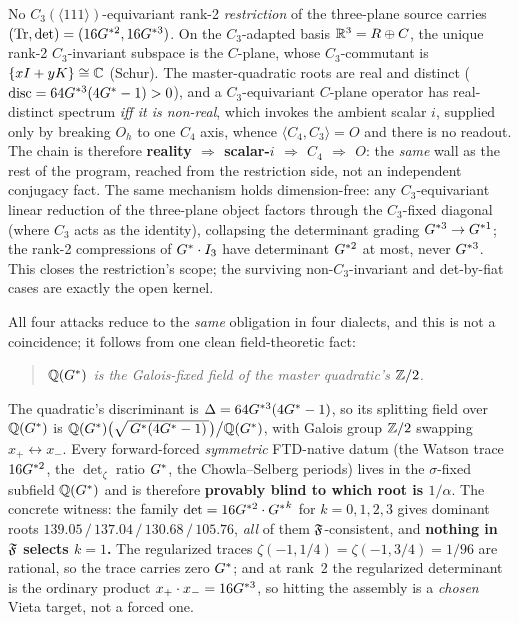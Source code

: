  No
$C_3(\langle111\rangle)$-equivariant rank-2 \emph{restriction} of the three-plane
source carries $(\operatorname{Tr},\operatorname{det})=(16G^{*2},16G^{*3})$. On the $C_3$-adapted basis
$\mathbb{R}^3=R\oplus C$, the unique rank-2 $C_3$-invariant subspace is the $C$-plane,
whose $C_3$-commutant is $\{xI+yK\}\cong\mathbb{C}$ (Schur). The master-quadratic roots
are real and distinct ($\mathrm{disc}=64G^{*3}(4G^{*}-1)>0$), and a
$C_3$-equivariant $C$-plane operator has real-distinct spectrum \emph{iff it is
non-real}, which invokes the ambient scalar $i$, supplied only by breaking
$O_h$ to one $C_4$ axis, whence $\langle C_4,C_3\rangle=O$ and there is no
readout. The chain is therefore \textbf{reality $\Rightarrow$ scalar-$i$
$\Rightarrow$ $C_4$ $\Rightarrow$ $O$}: the \emph{same} wall as the rest of
the program, reached from the restriction side, not an independent conjugacy
fact. The same mechanism holds dimension-free: any $C_3$-equivariant linear
reduction of the three-plane object factors through the $C_3$-fixed diagonal
(where $C_3$ acts as the identity), collapsing the determinant grading
$G^{*3}\to G^{*1}$; the rank-2 compressions of $G^{*}\cdot I_3$ have determinant
$G^{*2}$ at most, never $G^{*3}$. This closes the restriction's scope; the surviving
non-$C_3$-invariant and det-by-fiat cases are exactly the open kernel.

 All four attacks
reduce to the \emph{same} obligation in four dialects, and this is not a
coincidence; it follows from one clean field-theoretic fact:
\begin{quote}\itshape
  $\mathbb{Q}(G^{*})$ is the Galois-fixed field of the master quadratic's $\mathbb{Z}/2$.
\end{quote}
\noindent The quadratic's discriminant is $\Delta=64G^{*3}(4G^{*}-1)$, so its
splitting field over $\mathbb{Q}(G^{*})$ is $\mathbb{Q}(G^{*})\bigl(\sqrt{\,G^{*}(4G^{*} - 1)\,}\bigr)\big/\mathbb{Q}(G^{*})$, with Galois group $\mathbb{Z}/2$ swapping
$x_+\leftrightarrow x_-$. Every forward-forced \emph{symmetric} FTD-native
datum (the Watson trace $16G^{*2}$, the $\det_\zeta$ ratio $G^{*}$, the
Chowla--Selberg periods) lives in the $\sigma$-fixed subfield $\mathbb{Q}(G^{*})$ and
is therefore \textbf{provably blind to which root is $1/\alpha$}. The concrete
witness: the family $\det=16G^{*2}\cdot{G^{*}}^{k}$ for $k=0,1,2,3$ gives dominant
roots $139.05\,/\,137.04\,/\,130.68\,/\,105.76$, \emph{all} of them
$\mathfrak{F}$-consistent, and \textbf{nothing in $\mathfrak{F}$ selects $k=1$.} The
regularized traces $\zeta(-1,1/4)=\zeta(-1,3/4)=1/96$ are rational, so the trace
carries zero $G^{*}$; and at rank~2 the regularized determinant is the ordinary
product $x_+\cdot x_-=16G^{*3}$, so hitting the assembly is a \emph{chosen}
Vieta target, not a forced one.

